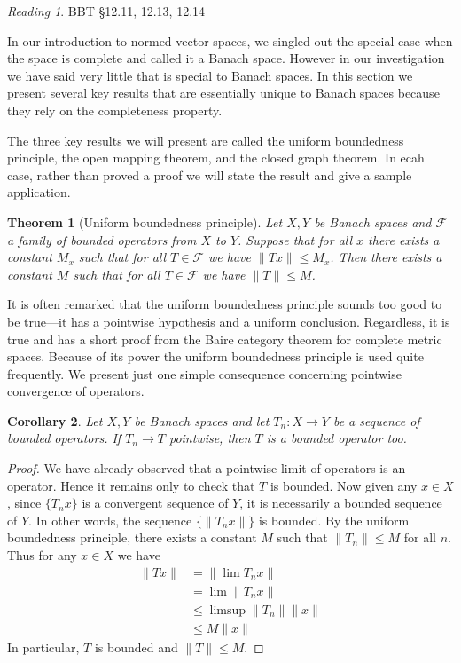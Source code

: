 \documentclass[11pt,oneside]{amsbook}
\theoremstyle{definition}
\theoremstyle{plain}
\newtheorem{thm}{Theorem}[section]
\newtheorem{cor}[thm]{Corollary}
\theoremstyle{definition}
\theoremstyle{remark}
\newtheorem*{reading}{Reading}
\numberwithin{equation}{section}
\numberwithin{figure}{section}
\begin{document}
\begin{reading}
  BBT \S 12.11, 12.13, 12.14
\end{reading}

In our introduction to normed vector spaces, we singled out the special case when the space is complete and called it a Banach space. However in our investigation we have said  very little that is special to Banach spaces. In this section we present several key results that are essentially unique to Banach spaces because they rely on the completeness property.

The three key results we will present are called the uniform boundedness principle, the open mapping theorem, and the closed graph theorem. In ecah case, rather than proved a proof we will state the result and give a sample application.

\begin{thm}[Uniform boundedness principle]
  Let $X,Y$ be Banach spaces and $\mathcal F$ a family of bounded operators from $X$ to $Y$. Suppose that for all $x$ there exists a constant $M_x$ such that for all $T\in\mathcal F$ we have $\|Tx\|\leq M_x$. Then there exists a constant $M$ such that for all $T\in\mathcal F$ we have $\|T\|\leq M$.
\end{thm}

It is often remarked that the uniform boundedness principle sounds too good to be true---it has a pointwise hypothesis and a uniform conclusion. Regardless, it is true and has a short proof from the Baire category theorem for complete metric spaces. Because of its power the uniform boundedness principle is used quite frequently. We present just one simple consequence concerning pointwise convergence of operators.

\begin{cor}
  Let $X,Y$ be Banach spaces and let $T_n\colon X\to Y$ be a sequence of bounded operators. If $T_n\to T$ pointwise, then $T$ is a bounded operator too.
\end{cor}

\begin{proof}
  We have already observed that a pointwise limit of operators is an operator. Hence it remains only to check that $T$ is bounded. Now given any $x\in X$, since $\{T_nx\}$ is a convergent sequence of $Y$, it is necessarily a bounded sequence of $Y$. In other words, the sequence $\{\|T_nx\|\}$ is bounded. By the uniform boundedness principle, there exists a constant $M$ such that $\|T_n\|\leq M$ for all $n$. Thus for any $x\in X$ we have
  \begin{align*}
    \|Tx\|&=\|\lim T_nx\|\\
          &=\lim\|T_nx\|\\
          &\leq\limsup\|T_n\|\|x\|\\
          &\leq M\|x\|
  \end{align*}
  In particular, $T$ is bounded and $\|T\|\leq M$.
\end{proof}
\end{document}
